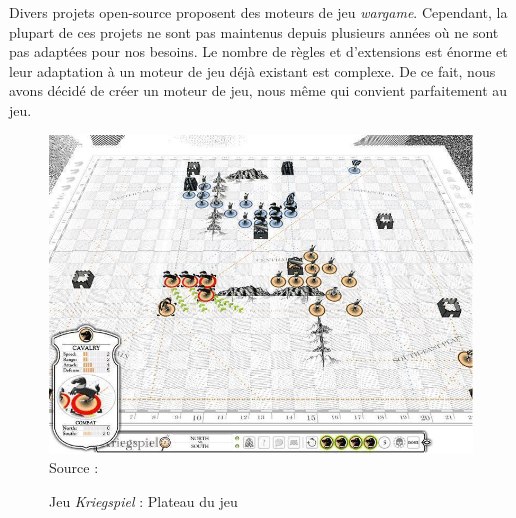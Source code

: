 Divers projets open-source proposent des moteurs de jeu \emph{wargame}. Cependant, la plupart de ces projets ne sont pas maintenus depuis plusieurs années où ne sont pas adaptées pour nos besoins.
Le nombre de règles et d'extensions est énorme et leur adaptation à un moteur de jeu déjà existant est complexe.
De ce fait, nous avons décidé de créer un moteur de jeu, nous même qui convient parfaitement au jeu.
\begin{figure}[H]
    \centering
    \includegraphics[scale=0.5]{data/kriegspiel.jpeg}\\
    Source : 
    \caption{Jeu \textit{Kriegspiel} : Plateau du jeu}
\end{figure}


